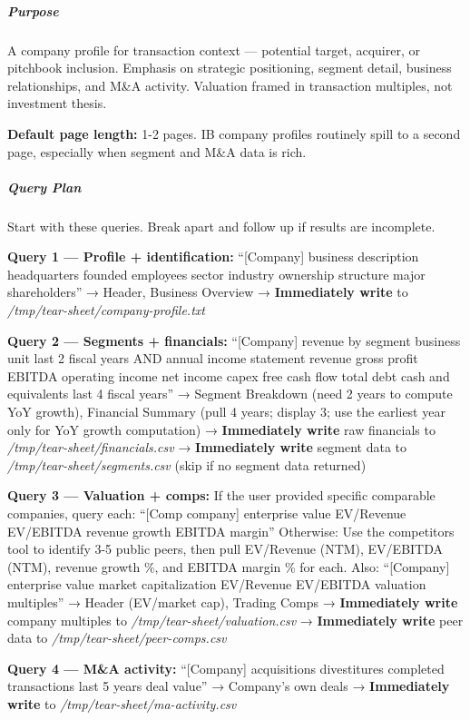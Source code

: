 \documentclass[11pt]{article}
\begin{document}
\subparagraph{Purpose}\mbox{}\par
A company profile for transaction context — potential target, acquirer, or pitchbook inclusion. Emphasis on strategic positioning, segment detail, business relationships, and M\&A activity. Valuation framed in transaction multiples, not investment thesis.


\textbf{Default page length:} 1-2 pages. IB company profiles routinely spill to a second page, especially when segment and M\&A data is rich.


\subparagraph{Query Plan}\mbox{}\par

Start with these queries. Break apart and follow up if results are incomplete.


\textbf{Query 1 — Profile + identification:} ``[Company] business description headquarters founded employees sector industry ownership structure major shareholders'' → Header, Business Overview → \textbf{Immediately write} to \emph{/tmp/tear-sheet/company-profile.txt}


\textbf{Query 2 — Segments + financials:} ``[Company] revenue by segment business unit last 2 fiscal years AND annual income statement revenue gross profit EBITDA operating income net income capex free cash flow total debt cash and equivalents last 4 fiscal years'' → Segment Breakdown (need 2 years to compute YoY growth), Financial Summary (pull 4 years; display 3; use the earliest year only for YoY growth computation) → \textbf{Immediately write} raw financials to \emph{/tmp/tear-sheet/financials.csv} → \textbf{Immediately write} segment data to \emph{/tmp/tear-sheet/segments.csv} (skip if no segment data returned)


\textbf{Query 3 — Valuation + comps:} If the user provided specific comparable companies, query each: ``[Comp company] enterprise value EV/Revenue EV/EBITDA revenue growth EBITDA margin'' Otherwise: Use the competitors tool to identify 3-5 public peers, then pull EV/Revenue (NTM), EV/EBITDA (NTM), revenue growth \%, and EBITDA margin \% for each. Also: ``[Company] enterprise value market capitalization EV/Revenue EV/EBITDA valuation multiples'' → Header (EV/market cap), Trading Comps → \textbf{Immediately write} company multiples to \emph{/tmp/tear-sheet/valuation.csv} → \textbf{Immediately write} peer data to \emph{/tmp/tear-sheet/peer-comps.csv}


\textbf{Query 4 — M\&A activity:} ``[Company] acquisitions divestitures completed transactions last 5 years deal value'' → Company's own deals → \textbf{Immediately write} to \emph{/tmp/tear-sheet/ma-activity.csv}
\end{document}
